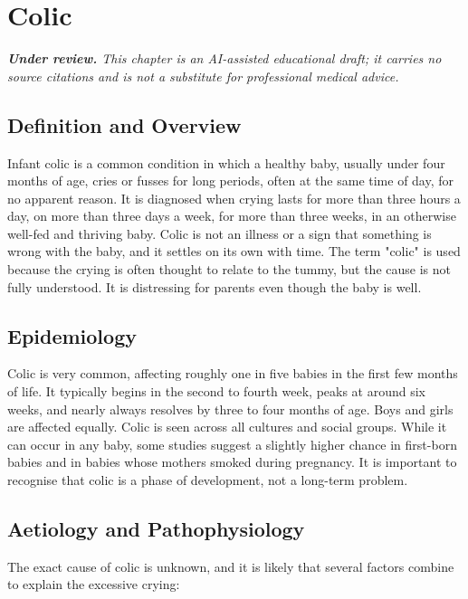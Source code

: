 \chapter{Colic}

\medskip
\noindent\textit{\textbf{Under review.} This chapter is an AI-assisted educational draft; it carries no source citations and is not a substitute for professional medical advice.}

\section*{Definition and Overview}
Infant colic is a common condition in which a healthy baby, usually under four months of age, cries or fusses for long periods, often at the same time of day, for no apparent reason. It is diagnosed when crying lasts for more than three hours a day, on more than three days a week, for more than three weeks, in an otherwise well-fed and thriving baby. Colic is not an illness or a sign that something is wrong with the baby, and it settles on its own with time. The term "colic" is used because the crying is often thought to relate to the tummy, but the cause is not fully understood. It is distressing for parents even though the baby is well.

\section*{Epidemiology}
Colic is very common, affecting roughly one in five babies in the first few months of life. It typically begins in the second to fourth week, peaks at around six weeks, and nearly always resolves by three to four months of age. Boys and girls are affected equally. Colic is seen across all cultures and social groups. While it can occur in any baby, some studies suggest a slightly higher chance in first-born babies and in babies whose mothers smoked during pregnancy. It is important to recognise that colic is a phase of development, not a long-term problem.

\section*{Aetiology and Pathophysiology}
The exact cause of colic is unknown, and it is likely that several factors combine to explain the excessive crying:

